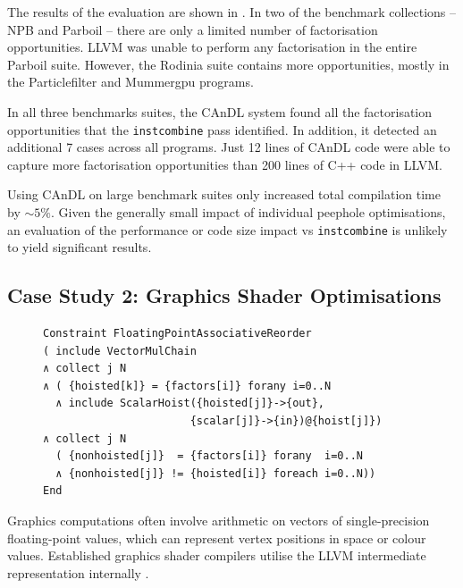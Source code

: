     The results of the evaluation are shown in
    .
    In two of the benchmark collections -- NPB and Parboil -- there are
    only a limited number of factorisation opportunities.
    LLVM was unable to perform any factorisation in the entire Parboil suite.
    However, the Rodinia suite contains more opportunities, mostly in the
    Particlefilter and Mummergpu programs.

    In all three benchmarks suites, the CAnDL system found all the factorisation
    opportunities that the \texttt{instcombine} pass identified.
    In addition, it detected an additional 7 cases across all programs.
    Just 12 lines of CAnDL code were able to capture more factorisation
    opportunities than 200 lines of C++ code in LLVM.

    Using CAnDL on large benchmark suites only increased total compilation time
    by ${\sim}5\%$.
    Given the generally small impact of individual peephole optimisations, an
    evaluation of the performance or code size impact vs {\tt instcombine} is
    unlikely to yield significant results.

\subsection{Case Study 2: Graphics Shader Optimisations}

\begin{figure}[t]
\begin{lstlisting}[language=CAnDL,label={fig:Lewis},caption=
   {CAnDL defines multiplication chains with genuine vectors and hoisted
    scalars:
    After separating the two cases, some of the multiplications can be performed
    on scalars instead.}]
Constraint FloatingPointAssociativeReorder
( include VectorMulChain
∧ collect j N
∧ ( {hoisted[k]} = {factors[i]} forany i=0..N
  ∧ include ScalarHoist({hoisted[j]}->{out},
                       {scalar[j]}->{in})@{hoist[j]})
∧ collect j N
  ( {nonhoisted[j]}  = {factors[i]} forany  i=0..N
  ∧ {nonhoisted[j]} != {hoisted[i]} foreach i=0..N))
End
\end{lstlisting}
\end{figure}

    Graphics computations often involve arithmetic on vectors of
    single-precision floating-point values, which can represent vertex positions
    in space or colour values.
    Established graphics shader compilers utilise the LLVM intermediate
    representation internally \citep{cudacompiler}.

